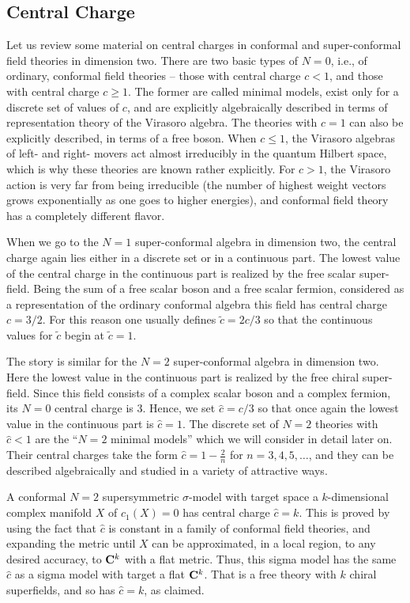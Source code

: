 \subsection{Central Charge}

Let us review some material on central charges in conformal and
super-conformal field theories in dimension two. There are two basic
types of  $N=0$,
i.e., of ordinary, conformal field theories -- those with central
charge $c<1$, and those with central charge $c\ge 1$. The
former are called minimal models, exist only for a discrete set of
values of $c$, and are explicitly
algebraically described in terms of representation theory of the Virasoro
algebra.
The theories with $c=1$ can also be explicitly described, in terms of
a free boson.  When $c\leq 1$, the Virasoro algebras of left- and right-
movers act almost irreducibly in the quantum Hilbert space, which
is why these theories are known rather explicitly.  For $c>1$, the
Virasoro action is very far from being irreducible (the number of  highest
weight vectors grows exponentially as one goes to higher energies), and
conformal field theory has a completely different flavor.

When we go to the $N=1$ super-conformal algebra in dimension two,
the central charge again lies either in a
discrete set or in  a continuous  part. The lowest value of the
central charge in the continuous part is realized by the free scalar
super-field. Being the sum of a free scalar boson and a free scalar
fermion, considered as a representation of the ordinary conformal
algebra  this field has
central charge  $c=3/2$. For this reason one usually defines $\widetilde
c=2c/3$ so that the continuous values for $\widetilde c$ begin at
$\widetilde c=1$.

The story is similar for the $N=2$ super-conformal algebra in
dimension two. Here the lowest value in the continuous part is
realized by the free chiral super-field. Since this field consists of
a complex  scalar boson and a complex fermion, its $N=0$ central
charge  is $3$. Hence, we set $\widehat c=c/3$ so that once  again the
lowest value in the continuous part is $\widehat c=1$.
The discrete set of $N=2$ theories with $\widehat c<1$
are the ``$N=2$ minimal models''
which we will consider in detail later on.  Their central charges take the
form $\widehat{c}=1-\frac2n$ for $n=3, 4, 5, \dots$, and they
can be described algebraically and studied in a variety of attractive ways.

A conformal $N=2$ supersymmetric
$\sigma$-model with target space a $k$-dimensional complex manifold
$X$ of $c_1(X)=0$
has central
charge $\widehat c= k$.   This is proved by using the fact that $\widehat c$ is
constant in a family of conformal field theories, and expanding the metric
until $X$ can be approximated, in a local region, to any desired
accuracy, to ${\bf C}^k$ with a flat metric.  Thus, this sigma model
has the same $\widehat c$ as a sigma model with target a flat ${\bf C}^k$.
That is a free theory with $k$ chiral superfields, and so has $\widehat c=k$,
as claimed.

